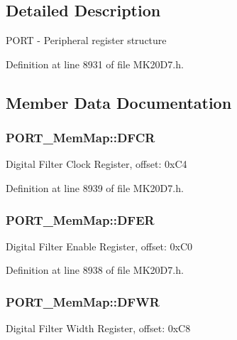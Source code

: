 \subsection{Detailed Description}
P\+O\+RT -\/ Peripheral register structure 

Definition at line 8931 of file M\+K20\+D7.\+h.



\subsection{Member Data Documentation}
\subsubsection[{\texorpdfstring{D\+F\+CR}{DFCR}}]{ P\+O\+R\+T\+\_\+\+Mem\+Map\+::\+D\+F\+CR}\hypertarget{struct_p_o_r_t___mem_map_a0d2552c73fb3c6ed5f336d7df1249151}{}\label{struct_p_o_r_t___mem_map_a0d2552c73fb3c6ed5f336d7df1249151}
Digital Filter Clock Register, offset\+: 0x\+C4 

Definition at line 8939 of file M\+K20\+D7.\+h.

\subsubsection[{\texorpdfstring{D\+F\+ER}{DFER}}]{ P\+O\+R\+T\+\_\+\+Mem\+Map\+::\+D\+F\+ER}\hypertarget{struct_p_o_r_t___mem_map_ad472de7afdaeef3985761041fe9023e2}{}\label{struct_p_o_r_t___mem_map_ad472de7afdaeef3985761041fe9023e2}
Digital Filter Enable Register, offset\+: 0x\+C0 

Definition at line 8938 of file M\+K20\+D7.\+h.

\subsubsection[{\texorpdfstring{D\+F\+WR}{DFWR}}]{ P\+O\+R\+T\+\_\+\+Mem\+Map\+::\+D\+F\+WR}\hypertarget{struct_p_o_r_t___mem_map_a739d09875cabb44276b89977d36a19ed}{}\label{struct_p_o_r_t___mem_map_a739d09875cabb44276b89977d36a19ed}
Digital Filter Width Register, offset\+: 0x\+C8 

